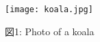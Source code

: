 \documentclass{jarticle}
\begin{document}
    \begin{figure}[htbp]
    \begin{center}
    \texttt{[image: koala.jpg]}
    \caption{図1: Photo of a koala}
    \end{center}
    \end{figure}
\end{document}
